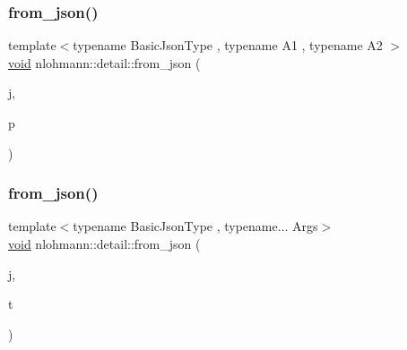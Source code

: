 \mbox{\label{namespacenlohmann_1_1detail_aae9f9c2601074e323d49428132cc293d}} 
\subsubsection{\texorpdfstring{from\_json()}{from\_json()}\hspace{0.1cm}{\footnotesize\ttfamily [15/18]}}
{\footnotesize\ttfamily template$<$typename Basic\+Json\+Type , typename A1 , typename A2 $>$ \\
\mbox{\hyperlink{namespacenlohmann_1_1detail_a59fca69799f6b9e366710cb9043aa77d}{void}} nlohmann\+::detail\+::from\+\_\+json (\begin{DoxyParamCaption}\item[{const Basic\+Json\+Type \&}]{j,  }\item[{std\+::pair$<$ A1, A2 $>$ \&}]{p }\end{DoxyParamCaption})}

\mbox{\label{namespacenlohmann_1_1detail_a8b99ec9b29f3f20a18fc4281fb784e49}} 
\subsubsection{\texorpdfstring{from\_json()}{from\_json()}\hspace{0.1cm}{\footnotesize\ttfamily [16/18]}}
{\footnotesize\ttfamily template$<$typename Basic\+Json\+Type , typename... Args$>$ \\
\mbox{\hyperlink{namespacenlohmann_1_1detail_a59fca69799f6b9e366710cb9043aa77d}{void}} nlohmann\+::detail\+::from\+\_\+json (\begin{DoxyParamCaption}\item[{const Basic\+Json\+Type \&}]{j,  }\item[{std\+::tuple$<$ Args... $>$ \&}]{t }\end{DoxyParamCaption})}

\mbox{\label{namespacenlohmann_1_1detail_ae93147a54d2740228ef16a5e6210ca3e}} 
